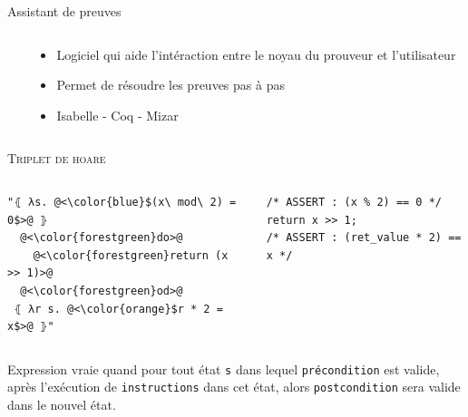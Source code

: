 \documentclass[hyperref={pdfpagelabels=false}]{beamer}
\begin{document}
\begin{frame}[fragile]{Assistant de preuves}
  \begin{columns}[T] %
    \begin{column}{.50\textwidth}
    \end{column}%
    \hfill%
    \begin{column}{.50\textwidth}
      \begin{itemize}
        \item Logiciel qui aide l'intéraction entre le noyau du prouveur et l'utilisateur
        \item Permet de résoudre les preuves pas à pas
        \item Isabelle - Coq - Mizar
      \end{itemize}
    \end{column}%
  \end{columns}
\end{frame}

\begin{frame}[fragile]
  \textsc{Triplet de hoare}
  \begin{columns}[T] %
    \begin{column}{.4\textwidth}
      \begin{lstlisting}
"⦃ λs. @<\color{blue}$(x\ mod\ 2) = 0$>@ ⦄
  @<\color{forestgreen}do>@
    @<\color{forestgreen}return (x >> 1)>@
  @<\color{forestgreen}od>@
 ⦃ λr s. @<\color{orange}$r * 2 = x$>@ ⦄"
      \end{lstlisting}
    \end{column}
    \begin{column}{.5\textwidth}
      \begin{verbatim}
/* ASSERT : (x % 2) == 0 */
return x >> 1;
/* ASSERT : (ret_value * 2) == x */
      \end{verbatim}
    \end{column}
  \end{columns}
  Expression vraie quand pour tout état \texttt{s} dans lequel \texttt{\color{blue}précondition} est valide, après l'exécution de \texttt{\color{forestgreen}instructions} dans cet état, alors \texttt{\color{orange}postcondition} sera valide dans le nouvel état.
\end{frame}
\end{document}
